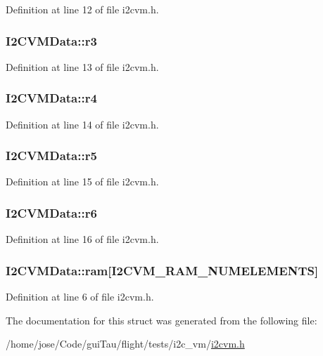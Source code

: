 Definition at line 12 of file i2cvm.\-h.

\hypertarget{struct_i2_c_v_m_data_a1d5b72045630c265b07c8e4e158bc9d6}{
\subsubsection[{r3}]{ I2\-C\-V\-M\-Data\-::r3}}\label{struct_i2_c_v_m_data_a1d5b72045630c265b07c8e4e158bc9d6}


Definition at line 13 of file i2cvm.\-h.

\hypertarget{struct_i2_c_v_m_data_a53ddf0fdf36d0e77d4573e671c87839d}{
\subsubsection[{r4}]{ I2\-C\-V\-M\-Data\-::r4}}\label{struct_i2_c_v_m_data_a53ddf0fdf36d0e77d4573e671c87839d}


Definition at line 14 of file i2cvm.\-h.

\hypertarget{struct_i2_c_v_m_data_a0cc4a4425c2f8d447a8629b6102db6d5}{
\subsubsection[{r5}]{ I2\-C\-V\-M\-Data\-::r5}}\label{struct_i2_c_v_m_data_a0cc4a4425c2f8d447a8629b6102db6d5}


Definition at line 15 of file i2cvm.\-h.

\hypertarget{struct_i2_c_v_m_data_a44579b97441bc54acb0deed60dff7a1f}{
\subsubsection[{r6}]{ I2\-C\-V\-M\-Data\-::r6}}\label{struct_i2_c_v_m_data_a44579b97441bc54acb0deed60dff7a1f}


Definition at line 16 of file i2cvm.\-h.

\hypertarget{struct_i2_c_v_m_data_aa78a321c590d3f7b5d503b948813c509}{
\subsubsection[{ram}]{ I2\-C\-V\-M\-Data\-::ram\mbox{[}I2\-C\-V\-M\-\_\-\-R\-A\-M\-\_\-\-N\-U\-M\-E\-L\-E\-M\-E\-N\-T\-S\mbox{]}}}\label{struct_i2_c_v_m_data_aa78a321c590d3f7b5d503b948813c509}


Definition at line 6 of file i2cvm.\-h.



The documentation for this struct was generated from the following file\-:\begin{DoxyCompactItemize}
\item 
/home/jose/\-Code/gui\-Tau/flight/tests/i2c\-\_\-vm/\hyperlink{i2cvm_8h}{i2cvm.\-h}\end{DoxyCompactItemize}
